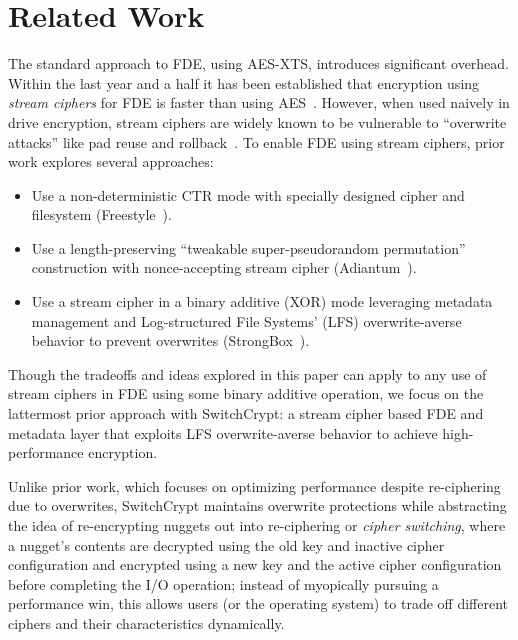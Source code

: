\section{Related Work}\label{sec:related}

The standard approach to FDE, using AES-XTS, introduces significant overhead. 
Within the last year and a half it has been established that encryption 
using \emph{stream ciphers} for FDE is faster than using
AES~\cite{StrongBox, AnotherPaper1, AnotherPaper2}. However, when used naively
in drive encryption, stream ciphers are widely known to be vulnerable to
``overwrite attacks'' like pad reuse and rollback~\cite{KatzLindell, StrongBox}.
To enable FDE using stream ciphers, prior work explores several approaches:

\begin{itemize}
   \item Use a non-deterministic CTR mode with specially designed cipher and
   filesystem (Freestyle~\cite{Freestyle}).
   \item Use a length-preserving ``tweakable super-pseudorandom permutation''
   construction with nonce-accepting stream cipher (Adiantum~\cite{Adiantum}).
   \item Use a stream cipher in a binary additive (XOR) mode leveraging metadata
   management and Log-structured File Systems' (LFS) overwrite-averse behavior
   to prevent overwrites (StrongBox~\cite{StrongBox}).
\end{itemize}

Though the tradeoffs and ideas explored in this paper can apply to any use of
stream ciphers in FDE using some binary additive operation, we focus on the
lattermost prior approach with SwitchCrypt: a stream cipher based FDE and
metadata layer that exploits LFS overwrite-averse behavior to achieve
high-performance encryption.

Unlike prior work, which focuses on optimizing performance despite re-ciphering
due to overwrites, SwitchCrypt maintains overwrite protections while abstracting
the idea of re-encrypting nuggets out into re-ciphering or \emph{cipher
switching}, where a nugget's contents are decrypted using the old key and
inactive cipher configuration and encrypted using a new key and the active
cipher configuration before completing the I/O operation; instead of myopically
pursuing a performance win, this allows users (or the operating system) to trade
off different ciphers and their characteristics dynamically.


 
